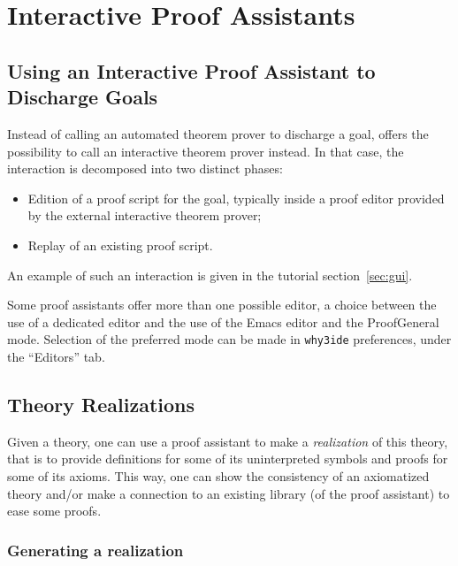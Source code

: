 \chapter{Interactive Proof Assistants}


\section{Using an Interactive Proof Assistant to Discharge Goals}

Instead of calling an automated theorem prover to discharge a goal,
\why offers the possibility to call an interactive theorem prover
instead. In that case, the interaction is decomposed into two distinct
phases:
\begin{itemize}
\item Edition of a proof script for the goal, typically inside a proof editor
  provided by the external interactive theorem prover;
\item Replay of an existing proof script.
\end{itemize}
An example of such an interaction is given in the tutorial
section~\ref{sec:gui}.

Some proof assistants offer more than one possible editor, \eg a
choice between the use of a dedicated editor and the use of the Emacs
editor and the ProofGeneral mode. Selection of the preferred mode can
be made in \texttt{why3ide} preferences, under the ``Editors'' tab.

\section{Theory Realizations}
\label{sec:realizations}

Given a \why theory, one can use a proof assistant to make a
\emph{realization} of this theory, that is to provide definitions for
some of its uninterpreted symbols and proofs for some of its
axioms. This way, one can show the consistency of an axiomatized
theory and/or make a connection to an existing library (of the proof
assistant) to ease some proofs.

\subsection{Generating a realization}


